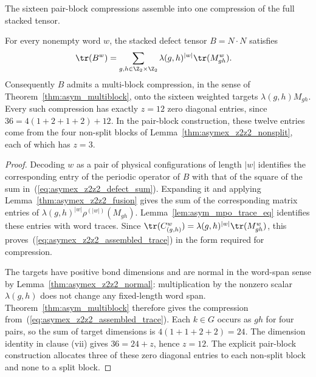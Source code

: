 The sixteen pair-block compressions assemble into one compression of
the full stacked tensor.

\begin{lemma}%
    \label{thm:asymex_z2z2_assembled}
    \leanok
    For every nonempty word $w$, the stacked defect tensor $B=N\cdot N$
    satisfies
    \begin{align}
        \tr(B^w)
         & =\sum_{g,h\in\Z_2\times\Z_2}
        \lambda(g,h)^{|w|}\tr(M_{gh}^w).
        \label{eq:asymex_z2z2_assembled_trace}
    \end{align}
    Consequently $B$ admits a multi-block compression, in the sense of
    Theorem~\ref{thm:asym_multiblock}, onto the sixteen weighted
    targets $\lambda(g,h)M_{gh}$.
    Every such compression has exactly $z=12$ zero diagonal entries,
    since $36=4(1+2+1+2)+12$.
    In the pair-block construction, these twelve entries come from
    the four non-split blocks of
    Lemma~\ref{thm:asymex_z2z2_nonsplit}, each of which has $z=3$.
\end{lemma}

\begin{proof}
    \leanok
    Decoding $w$ as a pair of physical configurations of length $|w|$
    identifies the corresponding entry of the periodic operator of $B$
    with that of the square of the sum in~(\ref{eq:asymex_z2z2_defect_sum}).
    Expanding it and applying Lemma~\ref{thm:asymex_z2z2_fusion} gives
    the sum of the corresponding matrix entries of
    $\lambda(g,h)^{|w|}\rho^{(|w|)}(M_{gh})$.
    Lemma~\ref{lem:asym_mpo_trace_eq} identifies these entries with
    word traces. Since
    $\tr(C_{(g,h)}^w)=\lambda(g,h)^{|w|}\tr(M_{gh}^w)$,
    this proves~(\ref{eq:asymex_z2z2_assembled_trace}) in the form
    required for compression.

    The targets have positive bond dimensions and are normal in the
    word-span sense by Lemma~\ref{thm:asymex_z2z2_normal}:
    multiplication by the nonzero scalar $\lambda(g,h)$ does not
    change any fixed-length word span.
    Theorem~\ref{thm:asym_multiblock} therefore gives the
    compression from~(\ref{eq:asymex_z2z2_assembled_trace}).
    Each $k\in G$ occurs as $gh$ for four pairs, so the sum of target
    dimensions is $4(1+1+2+2)=24$.
    The dimension identity in clause (vii) gives $36=24+z$, hence
    $z=12$.
    The explicit pair-block construction allocates three of these
    zero diagonal entries to each non-split block and none to a
    split block.
\end{proof}

